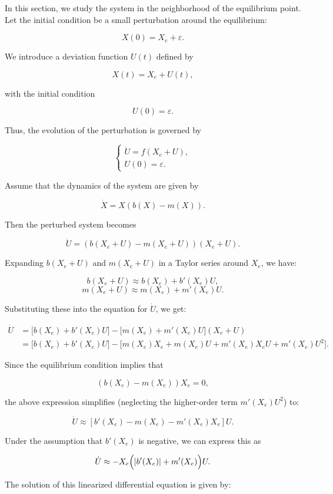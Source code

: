 In this section, we study the system in the neighborhood of the equilibrium point. Let the initial condition be a small perturbation around the equilibrium:

$$
X(0) = X_e + \varepsilon.
$$

We introduce a deviation function $U(t)$ defined by

$$
X(t) = X_e + U(t),
$$

with the initial condition

$$
U(0) = \varepsilon.
$$

Thus, the evolution of the perturbation is governed by

$$
\begin{cases}
\dot U = f(X_e + U), \\
U(0) = \varepsilon.
\end{cases}
$$

Assume that the dynamics of the system are given by

$$
\dot X = X(b(X) - m(X)).
$$

Then the perturbed system becomes

$$
\dot U = (b(X_e + U) - m(X_e + U))(X_e + U).
$$

Expanding $b(X_e + U)$ and $m(X_e + U)$ in a Taylor series around $X_e$, we have:

$$
b(X_e + U) \approx b(X_e) + b'(X_e)U,
$$
$$
m(X_e + U) \approx m(X_e) + m'(X_e)U.
$$

Substituting these into the equation for $\dot U$, we get:

$$
\begin{array}{rl}
\dot U & = \bigl[b(X_e) + b'(X_e)U\bigr] - \bigl[m(X_e) + m'(X_e)U\bigr](X_e + U) \\
      & = \bigl[b(X_e) + b'(X_e)U\bigr] - \bigl[m(X_e)X_e + m(X_e)U + m'(X_e)X_eU + m'(X_e)U^2\bigr].
\end{array}
$$

Since the equilibrium condition implies that

$$
(b(X_e) - m(X_e))X_e = 0,
$$

the above expression simplifies (neglecting the higher-order term $m'(X_e)U^2$) to:

$$
\dot U \approx \left[b'(X_e) - m(X_e) - m'(X_e)X_e\right] U.
$$

Under the assumption that $b'(X_e)$ is negative, we can express this as

$$
\dot U \approx -X_e\Bigl(|b'(X_e)| + m'(X_e)\Bigr)U.
$$

The solution of this linearized differential equation is given by:

